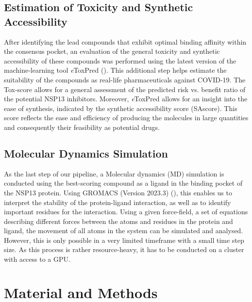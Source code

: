 \documentclass[11pt, letterpaper, titlepage]{article}
\begin{document}
\subsection{Estimation of Toxicity and Synthetic Accessibility}
 After identifying the lead compounds that exhibit optimal binding affinity within the consensus pocket, an evaluation of the general toxicity and synthetic accessibility of these compounds was performed using the latest version of the machine-learning tool \textit{e}ToxPred (\cite{pu2019toxpred}). This additional step helps estimate the suitability of the compounds as real-life pharmaceuticals against COVID-19. The Tox-score allows for a general assessment of the predicted risk vs. benefit ratio of the potential NSP13 inhibitors. Moreover, \textit{e}ToxPred allows for an insight into the ease of synthesis, indicated by the synthetic accessibility score (SAscore). This score reflects the ease and efficiency of producing the molecules in large quantities and consequently their feasibility as potential drugs. 

\subsection{Molecular Dynamics Simulation}
As the last step of our pipeline, a Molecular dynamics (MD) simulation is conducted using the best-scoring compound as a ligand in the binding pocket of the NSP13 protein. Using GROMACS (Version 2023.3) (\cite{package_GROMACS}), this enables us to interpret the stability of the protein-ligand interaction, as well as to identify important residues for the interaction. Using a given force-field, a set of equations describing different forces between the atoms and residues in the protein and ligand, the movement of all atoms in the system can be simulated and analysed. However, this is only possible in a very limited timeframe with a small time step size. As this process is rather resource-heavy, it has to be conducted on a cluster with access to a GPU. 


\section{Material and Methods}
\end{document}
